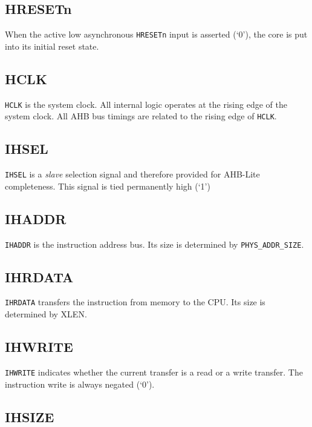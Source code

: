 \subsection{HRESETn}\label{hresetn}

When the active low asynchronous \texttt{HRESETn} input is asserted (`0'), the
core is put into its initial reset state.

\subsection{HCLK}\label{hclk}

\texttt{HCLK} is the system clock. All internal logic operates at the rising edge
of the system clock. All AHB bus timings are related to the rising edge
of \texttt{HCLK}.

\subsection{IHSEL}\label{ihsel}

\texttt{IHSEL} is a \emph{slave} selection signal and therefore provided for
AHB-Lite completeness. This signal is tied permanently high (`1')

\subsection{IHADDR}\label{ihaddr}

\texttt{IHADDR} is the instruction address bus. Its size is determined by
\texttt{PHYS\_ADDR\_SIZE}.

\subsection{IHRDATA}\label{ihrdata}

\texttt{IHRDATA} transfers the instruction from memory to the CPU. Its size is
determined by XLEN.
\texttt{
}\subsection{IHWRITE}\label{ihwrite}

\texttt{IHWRITE} indicates whether the current transfer is a read or a write
transfer. The instruction write is always negated (`0').

\subsection{IHSIZE}\label{ihsize}

